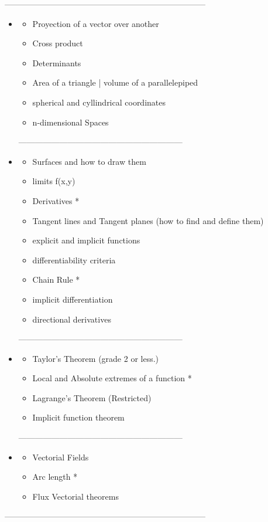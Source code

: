 \documentclass[11pt,fleqn]{book} %
\begin{document}
--------------------------------------------------------------------------
\begin{itemize}
    \item \begin{itemize}
        \item Proyection of a vector over another
        \item Cross product
        \item Determinants
        \item Area of a triangle | volume of a parallelepiped
        \item spherical and cyllindrical coordinates
        \item n-dimensional Spaces
    \end{itemize}
    ------------------------------------------------------------
    \item \begin{itemize}
        \item Surfaces and how to draw them
        \item limits f(x,y)
        \item Derivatives *
        \item Tangent lines and Tangent planes (how to find and define them)
        \item explicit and implicit functions
        \item differentiability criteria
        \item Chain Rule *
        \item implicit differentiation
        \item directional derivatives
    \end{itemize}
    ------------------------------------------------------------
    \item \begin{itemize}
        \item Taylor's Theorem (grade 2 or less.)
        \item Local and Absolute extremes of a function *
        \item Lagrange's Theorem (Restricted)
        \item Implicit function theorem
    \end{itemize}
    ------------------------------------------------------------
    \item \begin{itemize}
        \item Vectorial Fields
        \item Arc length *
        \item Flux Vectorial theorems
    \end{itemize}
\end{itemize}
--------------------------------------------------------------------------
\end{document}
